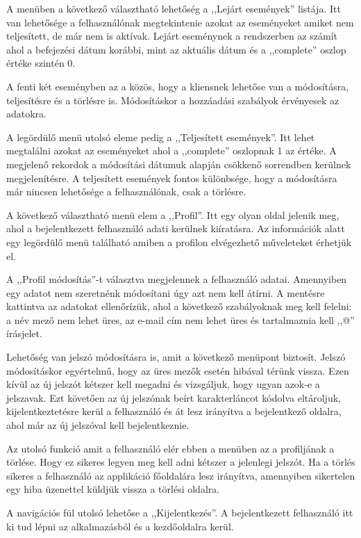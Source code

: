 \documentclass[
]{thesis-ekf}
\theoremstyle{definition}
\theoremstyle{remark}
\begin{document}
A menüben a következő választható lehetőség a ,,Lejárt események'' listája. Itt van lehetősége a felhasználónak megtekintenie azokat az eseményeket amiket nem teljesített, de már nem is aktívak. Lejárt eseménynek a rendszerben az számít ahol a befejezési dátum korábbi, mint az aktuális dátum és a ,,complete'' oszlop értéke szintén 0. 

A fenti két eseményben az a közös, hogy a kliensnek lehetőse van a módosításra, teljesítésre és a törlésre is. Módosításkor a hozzáadási szabályok érvényesek az adatokra.

A legördülő menü utolsó eleme pedig a ,,Teljesített események''. Itt lehet megtalálni azokat az eseményeket ahol a ,,complete'' oszlopnak 1 az értéke. A megjelenő rekordok a módosítási dátumuk alapján csökkenő sorrendben kerülnek megjelenítésre. A teljesített események fontos különbsége, hogy a módosításra már nincsen lehetősége a felhasználónak, csak a törlésre.

A következő választható menü elem a ,,Profil''. Itt egy olyan oldal jelenik meg, ahol a bejelentkezett felhasználó adati kerülnek kiíratásra. Az információk alatt egy legördülő menü található amiben a profilon elvégezhető műveleteket érhetjük el.

A ,,Profil módosítás''-t választva megjelennek a felhasználó adatai. Amennyiben egy adatot nem szeretnénk módosítani úgy azt nem kell átírni. A mentésre kattintva az adatokat ellenőrízük,  ahol a következő szabályoknak meg kell felelni: a név mező nem lehet üres, az e-mail cím nem lehet üres és tartalmaznia kell ,,@'' írásjelet.

Lehetőség van jelszó módosításra is, amit a következő menüpont biztosít. Jelszó módosításkor egyértelmű, hogy az üres mezők esetén hibával térünk vissza. Ezen kívül az új jelszót kétszer kell megadni és vizsgáljuk, hogy ugyan azok-e a jelszavak. Ezt követően az új jelszónak beírt karakterláncot kódolva eltároljuk, kijelentkeztetésre kerül a felhasználó és át lesz irányítva a bejelentkező oldalra, ahol már az új jelszóval kell bejelentkeznie.

Az utolsó funkció amit a felhasználó elér ebben a menüben az a profiljának a törlése. Hogy ez sikeres legyen meg kell adni kétszer a jelenlegi jelszót. Ha a törlés sikeres a felhasználó az applikáció főoldalára lesz irányítva, amennyiben sikertelen egy hiba üzenettel küldjük vissza a törlési oldalra.

A navigációs fül utolsó lehetőse a ,,Kijelentkezés''. A bejelentkezett felhasználó itt ki tud lépni az alkalmazásból és a kezdőoldalra kerül. 
\end{document}
